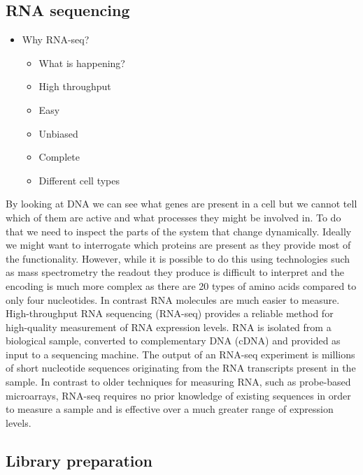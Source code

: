 \documentclass[11pt,a4paper,titlepage,twoside,openright]{style/unimelbthesis}
\theoremstyle{definition}
\theoremstyle{definition}
\theoremstyle{definition}
\theoremstyle{remark}
\begin{document}
\begin{mainmatter}
\hypertarget{rna-sequencing}{%
\section{RNA sequencing}\label{rna-sequencing}}

\begin{itemize}
\tightlist
\item
  Why RNA-seq?

  \begin{itemize}
  \tightlist
  \item
    What is happening?
  \item
    High throughput
  \item
    Easy
  \item
    Unbiased
  \item
    Complete
  \item
    Different cell types
  \end{itemize}
\end{itemize}

By looking at DNA we can see what genes are present in a cell but we cannot tell which of them are active and what processes they might be involved in. To do that we need to inspect the parts of the system that change dynamically. Ideally we might want to interrogate which proteins are present as they provide most of the functionality. However, while it is possible to do this using technologies such as mass spectrometry the readout they produce is difficult to interpret and the encoding is much more complex as there are 20 types of amino acids compared to only four nucleotides. In contrast RNA molecules are much easier to measure. High-throughput RNA sequencing (RNA-seq) provides a reliable method for high-quality measurement of RNA expression levels. RNA is isolated from a biological sample, converted to complementary DNA (cDNA) and provided as input to a sequencing machine. The output of an RNA-seq experiment is millions of short nucleotide sequences originating from the RNA transcripts present in the sample. In contrast to older techniques for measuring RNA, such as probe-based microarrays, RNA-seq requires no prior knowledge of existing sequences in order to measure a sample and is effective over a much greater range of expression levels.

\hypertarget{library-preparation}{%
\subsection{Library preparation}\label{library-preparation}}


\end{mainmatter}
\end{document}
